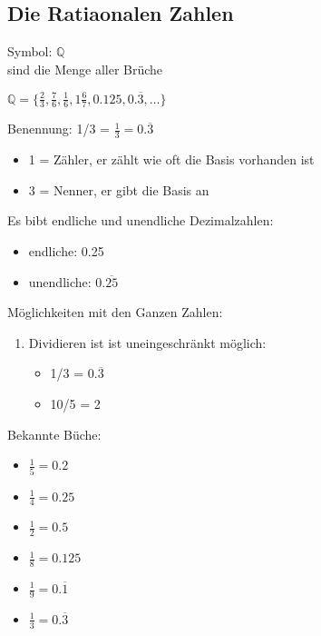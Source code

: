 \subsection{Die Ratiaonalen Zahlen}
Symbol: $\mathbb{Q}$\\
sind die Menge aller Brüche

\hfill \break
\hfill \break
$ \mathbb{Q}=\{\frac{2}{3},\frac{7}{6},\frac{1}{6},1\frac{6}{7},0.125,0.\overline{3},\ldots\} $

\hfill \break
{}

\hfill \break
Benennung: 1/3 = $\frac{1}{3} = 0.\overline{3}$
\begin{itemize}
    \item 1 = Zähler, er zählt wie oft die Basis vorhanden ist
    \item 3 = Nenner, er gibt die Basis an
\end{itemize}

\hfill \break
Es bibt endliche und unendliche Dezimalzahlen:
\begin{itemize}
    \item endliche: 0.25
    \item unendliche: $0.\overline{25}$
\end{itemize}

\hfill \break
Möglichkeiten mit den Ganzen Zahlen:
\begin{enumerate}
    \item Dividieren ist ist uneingeschränkt möglich:
          \begin{itemize}
              \item 1/3 = $0.\overline{3}$
              \item 10/5 = 2
          \end{itemize}
\end{enumerate}

\hfill \break
Bekannte Büche:
\begin{itemize}
    \item $\frac{1}{5} = 0.2$
    \item $\frac{1}{4} = 0.25$
    \item $\frac{1}{2} = 0.5$
    \item $\frac{1}{8} = 0.125$
    \item $\frac{1}{9} = 0.\overline{1}$
    \item $\frac{1}{3} = 0.\overline{3}$
\end{itemize}
